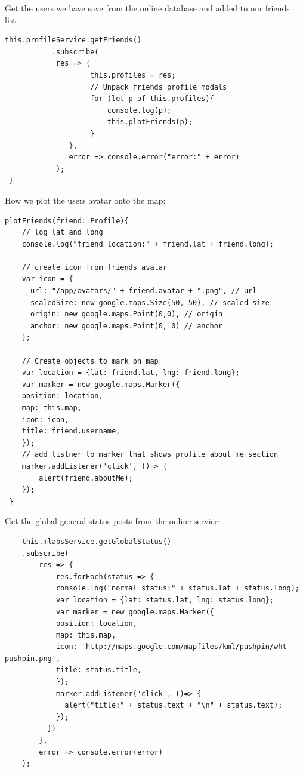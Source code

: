 Get the users we have save from the online database and added to our friends list:
\begin{lstlisting}
this.profileService.getFriends()
           .subscribe(
            res => {
                    this.profiles = res;
                    // Unpack friends profile modals
                    for (let p of this.profiles){
                        console.log(p);
                        this.plotFriends(p);
                    }
               },
               error => console.error("error:" + error)
            );
 }

\end{lstlisting}

How we plot the users avatar onto the map:
\begin{lstlisting}
plotFriends(friend: Profile){
    // log lat and long
    console.log("friend location:" + friend.lat + friend.long);

    // create icon from friends avatar
    var icon = {
      url: "/app/avatars/" + friend.avatar + ".png", // url
      scaledSize: new google.maps.Size(50, 50), // scaled size
      origin: new google.maps.Point(0,0), // origin
      anchor: new google.maps.Point(0, 0) // anchor
    };

    // Create objects to mark on map
    var location = {lat: friend.lat, lng: friend.long};
    var marker = new google.maps.Marker({
    position: location, 
    map: this.map,
    icon: icon,
    title: friend.username,
    });
    // add listner to marker that shows profile about me section
    marker.addListener('click', ()=> {
        alert(friend.aboutMe);
    }); 
 }
\end{lstlisting}

Get the global general status posts from the online service:
\begin{lstlisting}
    this.mlabsService.getGlobalStatus()
    .subscribe(
        res => {
            res.forEach(status => {
            console.log("normal status:" + status.lat + status.long);
            var location = {lat: status.lat, lng: status.long};
            var marker = new google.maps.Marker({
            position: location, 
            map: this.map,
            icon: 'http://maps.google.com/mapfiles/kml/pushpin/wht-pushpin.png',
            title: status.title,
            });
            marker.addListener('click', ()=> {
              alert("title:" + status.text + "\n" + status.text);
            }); 
          })  
        },
        error => console.error(error)
    );
\end{lstlisting}
